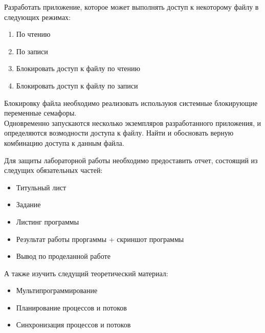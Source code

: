 \documentclass[a4paper,12pt]{article}
\begin{document}
  
  \begin{flushleft}
    Разработать приложение, которое может выполнять доступ к некоторому файлу в следующих режимах:
    
   \begin{enumerate}
     \item По чтению
     \item По записи
     \item Блокировать доступ к файлу по чтению
     \item Блокировать доступ к файлу по записи
   \end{enumerate}

  Блокировку файла необходимо реализовать используюя системные блокирующие переменные семафоры.
  \\
  Одновременно запускаются несколько экземпляров разработанного приложения, и определяются возмодности доступа к файлу. Найти и обосновать верную комбинацию доступа к данным файла.

  
  Для защиты лабораторной работы необходимо предоставить отчет, состоящий из следущих обязательных частей:
  \begin{itemize}
   \item Титульный лист
   \item Задание
   \item Листинг программы
   \item Результат работы проргаммы + скриншот программы
   \item Вывод по проделанной работе
  \end{itemize}



  А также изучить следущий теоретический материал:
  \begin{itemize}
   \item Мультипрограммирование
   \item Планирование процессов и потоков
   \item Синхронизация процессов и потоков
  \end{itemize}






\end{flushleft}
\end{document}
